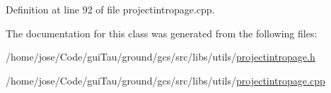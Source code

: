Definition at line 92 of file projectintropage.\-cpp.



The documentation for this class was generated from the following files\-:\begin{DoxyCompactItemize}
\item 
/home/jose/\-Code/gui\-Tau/ground/gcs/src/libs/utils/\hyperlink{projectintropage_8h}{projectintropage.\-h}\item 
/home/jose/\-Code/gui\-Tau/ground/gcs/src/libs/utils/\hyperlink{projectintropage_8cpp}{projectintropage.\-cpp}\end{DoxyCompactItemize}
